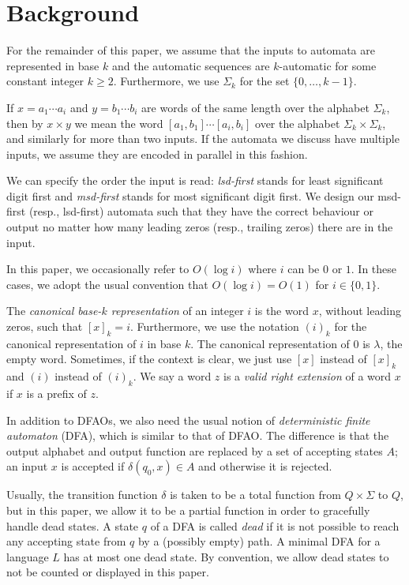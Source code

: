 \documentclass[12pt,reqno]{article}
\begin{document}
\section{Background} \label{section:background}

For the remainder of this paper, we assume that the inputs to automata are represented in base $k$ and the automatic sequences are $k$-automatic for some constant integer $k\geq 2$. Furthermore, we use $\Sigma_k$ for the set $\{0, \ldots, k-1\}$.

If $x = a_1 \cdots a_i$ and $y = b_1 \cdots b_i$ are words of the same length over the alphabet $\Sigma_k$, 
then by $x \times y$ we mean the word $[a_1, b_1] \cdots [a_i, b_i]$ over the alphabet
$\Sigma_k \times \Sigma_k$, and similarly for more than two inputs.  If the automata we discuss have multiple inputs, we assume they are encoded in parallel in this fashion.

We can specify the order the input is read:  \textit{lsd-first} stands for least significant digit first and \textit{msd-first} stands for most significant digit first. We design our msd-first (resp., lsd-first) automata such that they have the correct behaviour or output no matter how many leading zeros (resp., trailing zeros) there are in the input.

In this paper, we occasionally refer to $O(\log i)$ where $i$ can be $0$ or $1$. In these cases, we adopt the usual convention that $O(\log i) = O(1)$ for $i \in \{0,1 \}$.

The {\it canonical base-$k$ representation\/} of an integer $i$ is the word $x$, without leading zeros, such that $[x]_k = i$.  Furthermore, we use
the notation $(i)_k$ for the canonical representation of $i$ in base $k$.   The canonical representation of $0$ is $\lambda$, the empty word. Sometimes, if the context is clear, we just use $[x]$ instead of $[x]_k$ and $(i)$ instead of $(i)_k$.  We say a word $z$ is a {\it valid right extension\/} of a word $x$
if $x$ is a prefix of $z$.

In addition to DFAOs, we also need the usual notion of {\it deterministic finite automaton} (DFA), which is similar to that of DFAO.  The difference is that
the output alphabet and output function are replaced by a set of
accepting states $A$; an input $x$ is accepted if $\delta(q_0, x) \in A$
and otherwise it is rejected.

Usually, the transition function $\delta$ is taken to be a total
function from $Q \times \Sigma$ to $Q$, but in this paper, we allow
it to be a partial function in order to gracefully handle dead states. 
A state $q$ of a DFA is called {\it dead} if it is not
possible to reach any accepting state from $q$ by a 
(possibly empty) path.  A minimal DFA for a language $L$ has at most one dead state.  By convention, we allow dead states to not be counted or displayed in this paper.
\end{document}
